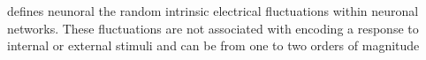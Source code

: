 \documentclass[a4paper]{article}
\title{}
\date{}
\begin{document}
\maketitle
     defines neunoral the random intrinsic electrical fluctuations within neuronal networks. These fluctuations are not associated with encoding a response to internal or external stimuli and can be from one to two orders of magnitude
    
    
\end{document}
